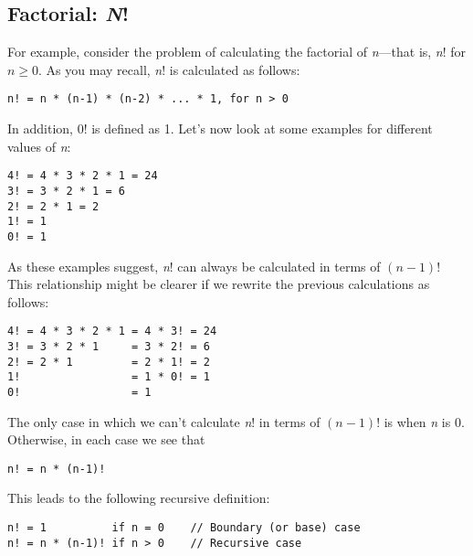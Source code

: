 \subsection{Factorial: {\it N}!}
\noindent For example, consider the problem of calculating the
factorial of {\it n}---that is, {\it n}! for $n
\geq 0$. As you may recall, {\it n}! is calculated as follows:

\begin{jjjlisting}
\begin{lstlisting}
n! = n * (n-1) * (n-2) * ... * 1, for n > 0
\end{lstlisting}
\end{jjjlisting}

\noindent In addition, 0! is defined as 1. Let's now look at some
examples for different values of {\it n}:

\begin{jjjlisting}
\begin{lstlisting}
4! = 4 * 3 * 2 * 1 = 24
3! = 3 * 2 * 1 = 6
2! = 2 * 1 = 2
1! = 1
0! = 1
\end{lstlisting}
\end{jjjlisting}

\noindent As these examples suggest, {\it n}! can always be calculated
in terms of $(n-1)$!  This relationship might be clearer if we rewrite
the previous calculations as follows:

\begin{jjjlisting}
\begin{lstlisting}
4! = 4 * 3 * 2 * 1 = 4 * 3! = 24
3! = 3 * 2 * 1     = 3 * 2! = 6
2! = 2 * 1         = 2 * 1! = 2
1!                 = 1 * 0! = 1
0!                 = 1
\end{lstlisting}
\end{jjjlisting}

\noindent The only case in which we can't calculate {\it n}! in terms of
$(n-1)$! is when {\it n} is 0. Otherwise, in each case we see that

\begin{jjjlisting}
\begin{lstlisting}
n! = n * (n-1)!
\end{lstlisting}
\end{jjjlisting}

\noindent This leads to the following recursive definition:

\begin{jjjlisting}
\begin{lstlisting}
n! = 1          if n = 0    // Boundary (or base) case
n! = n * (n-1)! if n > 0    // Recursive case
\end{lstlisting}
\end{jjjlisting}

